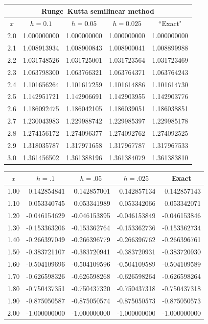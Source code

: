 \documentclass[dvips]{book}
\renewcommand{\exer}[1]{\par\medskip\;\noindent{\color{red}\bf #1.}}
\numberwithin{example}{section}
\numberwithin{equation}{section}
\numberwithin{theorem}{section}
\numberwithin{table}{section}
\numberwithin{figure}{section}
\begin{document}
{\small
\begin{tabular}{|c|r|r|r|r|}
\hline
\multicolumn{5}{|c|}{Runge--Kutta semilinear method}\\\hline
\multicolumn{1}{|c|}{$x$}&
\multicolumn{1}{|c|}{$h=0.1$}&
\multicolumn{1}{|c|}{$h=0.05$}&
\multicolumn{1}{|c|}{$h=0.025$}&
\multicolumn{1}{|c|}{``Exact"}\\ \hline
2.0 & 1.000000000 & 1.000000000 & 1.000000000 & 1.000000000 \\
2.1 & 1.008913934 & 1.008900843 & 1.008900041 & 1.008899988 \\
2.2 & 1.031748526 & 1.031725001 & 1.031723564 & 1.031723469 \\
2.3 & 1.063798300 & 1.063766321 & 1.063764371 & 1.063764243 \\
2.4 & 1.101656264 & 1.101617259 & 1.101614886 & 1.101614730 \\
2.5 & 1.142951721 & 1.142906691 & 1.142903955 & 1.142903776 \\
2.6 & 1.186092475 & 1.186042105 & 1.186039051 & 1.186038851 \\
2.7 & 1.230043983 & 1.229988742 & 1.229985397 & 1.229985178 \\
2.8 & 1.274156172 & 1.274096377 & 1.274092762 & 1.274092525 \\
2.9 & 1.318035787 & 1.317971658 & 1.317967787 & 1.317967533 \\
3.0 & 1.361456502 & 1.361388196 & 1.361384079 & 1.361383810 \\
\hline
\end{tabular}}


\exer{3.3.24}
{\small
\begin{tabular}{|r|r|r|r|r|}
\hline
\multicolumn{1}{|c|}{$x$}&
\multicolumn{1}{|c|}{$h=.1$}&
\multicolumn{1}{|c|}{$h=.05$}&
\multicolumn{1}{|c|}{$h=.025$}&
\multicolumn{1}{|c|}{Exact}\\ \hline
1.00  &  0.142854841 &  0.142857001 &  0.142857134 &  0.142857143 \\
1.10  &  0.053340745 &  0.053341989 &  0.053342066 &  0.053342071 \\
1.20  & -0.046154629 & -0.046153895 & -0.046153849 & -0.046153846 \\
1.30  & -0.153363206 & -0.153362764 & -0.153362736 & -0.153362734 \\
1.40  & -0.266397049 & -0.266396779 & -0.266396762 & -0.266396761 \\
1.50  & -0.383721107 & -0.383720941 & -0.383720931 & -0.383720930 \\
1.60  & -0.504109696 & -0.504109596 & -0.504109589 & -0.504109589 \\
1.70  & -0.626598326 & -0.626598268 & -0.626598264 & -0.626598264 \\
1.80  & -0.750437351 & -0.750437320 & -0.750437318 & -0.750437318 \\
1.90  & -0.875050587 & -0.875050574 & -0.875050573 & -0.875050573 \\
2.00  & -1.000000000 & -1.000000000 & -1.000000000 & -1.000000000 \\
\hline
\end{tabular}}
\end{document}
